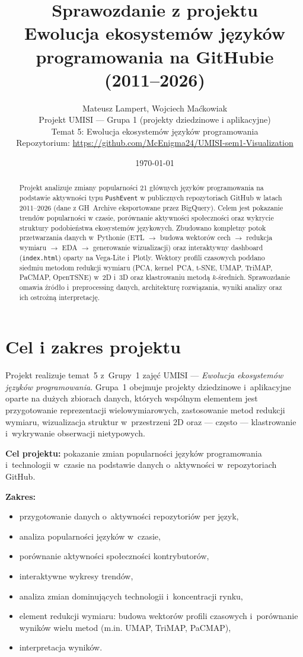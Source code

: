 \documentclass[11pt,a4paper]{article}
\title{\textbf{Sprawozdanie z projektu}\\[0.4em]
\large Ewolucja ekosystemów języków programowania na GitHubie (2011--2026)}
\author{Mateusz Lampert, Wojciech Maćkowiak\\[0.4em]
Projekt UMISI --- Grupa 1 (projekty dziedzinowe i aplikacyjne)\\
Temat 5: Ewolucja ekosystemów języków programowania\\[0.4em]
\normalsize Repozytorium: \url{https://github.com/McEnigma24/UMISI-sem1-Visualization}}
\date{\today}
\begin{document}
\maketitle

\begin{abstract}
\noindent
Projekt analizuje zmiany popularności 21 głównych języków programowania na podstawie
aktywności typu \texttt{PushEvent} w publicznych repozytoriach GitHub w latach
2011--2026 (dane z GH~Archive eksportowane przez BigQuery). Celem jest pokazanie
trendów popularności w czasie, porównanie aktywności społeczności oraz wykrycie
struktury podobieństwa ekosystemów językowych. Zbudowano kompletny potok przetwarzania
danych w~Pythonie (ETL $\rightarrow$ budowa wektorów cech $\rightarrow$ redukcja wymiaru
$\rightarrow$ EDA $\rightarrow$ generowanie wizualizacji) oraz interaktywny dashboard
(\texttt{index.html}) oparty na Vega-Lite i~Plotly. Wektory profili czasowych poddano
siedmiu metodom redukcji wymiaru (PCA, kernel~PCA, t-SNE, UMAP, TriMAP, PaCMAP, OpenTSNE)
w~2D i~3D oraz klastrowaniu metodą $k$-średnich. Sprawozdanie omawia źródło i~preprocessing
danych, architekturę rozwiązania, wyniki analizy oraz ich ostrożną interpretację.
\end{abstract}

\tableofcontents
\newpage

\section{Cel i zakres projektu}

Projekt realizuje temat~5 z~Grupy~1 zajęć UMISI --- \emph{Ewolucja ekosystemów języków
programowania}. Grupa~1 obejmuje projekty dziedzinowe i~aplikacyjne oparte na dużych
zbiorach danych, których wspólnym elementem jest przygotowanie reprezentacji
wielowymiarowych, zastosowanie metod redukcji wymiaru, wizualizacja struktur w~przestrzeni
2D oraz --- często --- klastrowanie i~wykrywanie obserwacji nietypowych.

\textbf{Cel projektu:} pokazanie zmian popularności języków programowania i~technologii
w~czasie na podstawie danych o~aktywności w~repozytoriach GitHub.

\textbf{Zakres:}
\begin{itemize}[nosep]
  \item przygotowanie danych o~aktywności repozytoriów per język,
  \item analiza popularności języków w~czasie,
  \item porównanie aktywności społeczności kontrybutorów,
  \item interaktywne wykresy trendów,
  \item analiza zmian dominujących technologii i~koncentracji rynku,
  \item element redukcji wymiaru: budowa wektorów profili czasowych i~porównanie wyników
        wielu metod (m.in. UMAP, TriMAP, PaCMAP),
  \item interpretacja wyników.
\end{itemize}
\end{document}

